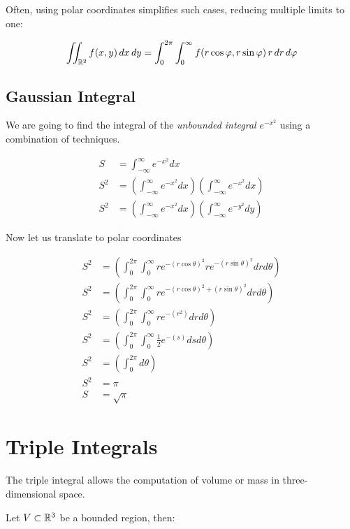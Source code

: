 Often, using polar coordinates simplifies such cases, reducing multiple limits to one:

\[
    \iint_{\mathbb{R}^2} f(x, y)\, dx\, dy = \int_0^{2\pi} \int_0^{\infty} f(r \cos \varphi, r \sin \varphi)\, 
    r\, dr\, d\varphi
\]

\subsection{Gaussian Integral}

We are going to find the integral of the \emph{unbounded integral} 
\(e^{-x^2}\) using a combination of techniques.

\begin{align*}
    S &= \int_{-\infty}^{\infty} e^{-x^2}dx\\
    S^2 &= \left(\int_{-\infty}^{\infty} e^{-x^2}dx\right) \left(\int_{-\infty}^{\infty} e^{-x^2}dx\right)\\
    S^2 &= \left(\int_{-\infty}^{\infty} e^{-x^2}dx\right) \left(\int_{-\infty}^{\infty} e^{-y^2}dy\right)
\end{align*}

Now let us translate to polar coordinates

\begin{align*}
    S^2 &= \left(\int_{0}^{2\pi} \int_{0}^{\infty}re^{-{(r\cos\theta)}^2} re^{-{(r\sin\theta)}^2}drd\theta\right)\\
    S^2 &= \left(\int_{0}^{2\pi} \int_{0}^{\infty}re^{-{(r\cos\theta)}^2 + {(r\sin\theta)}^2}drd\theta\right)\\
    S^2 &= \left(\int_{0}^{2\pi} \int_{0}^{\infty}re^{-(r^2)}drd\theta\right)\\
    S^2 &=  \left(\int_{0}^{2\pi} \int_{0}^{\infty}\frac{1}{2}e^{-(s)}dsd\theta\right)\\
    S^2 &= \left(\int_{0}^{2\pi}d\theta\right)\\
    S^2 &= \pi\\
    S   &= \sqrt{\pi}
\end{align*}

\QED

\section{Triple Integrals}

The triple integral allows the computation of volume or mass in three-dimensional space.

Let \( V \subset \mathbb{R}^3 \) be a bounded region, then:

